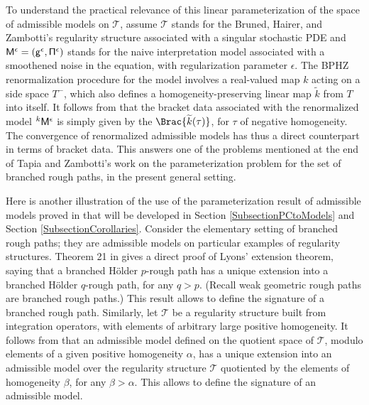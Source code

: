 To understand the practical relevance of this linear parameterization of the space of admissible models on $\mathscr{T}$, assume $\mathscr{T}$ stands for the Bruned, Hairer, and Zambotti's regularity structure \cite{BHZ} associated with a singular stochastic PDE and ${\sf M}^\epsilon = ({\sf g}^\epsilon,{\sf \Pi}^\epsilon)$ stands for the naive interpretation model associated with a smoothened noise in the equation, with regularization parameter $\epsilon$. The BPHZ renormalization procedure for the model involves a real-valued map $k$ acting on a side space $T^-$, which also defines a homogeneity-preserving linear map $\widetilde{k}$ from $T$ into itself. It follows from \cite[Th.\,21]{BH} that the bracket data associated with the renormalized model $^k{{\sf M}^\epsilon}$ is simply given by the $\Brac{\widetilde{k}(\tau)}$, for $\tau$ of negative homogeneity. The convergence of renormalized admissible models has thus a direct counterpart in terms of bracket data. This answers one of the problems mentioned at the end of Tapia and Zambotti's work \cite{TZ18} on the parameterization problem for the set of branched rough paths, in the present general setting.

Here is another illustration of the use of the parameterization result of admissible models proved in \cite{BH} that will be developed in Section \ref{SubsectionPCtoModels} and Section \ref{SubsectionCorollaries}. Consider the elementary setting of branched rough paths; they are admissible models on particular examples of regularity structures. Theorem 21 in \cite{BH} gives a direct proof of Lyons' extension theorem, saying that a branched Hölder $p$-rough path has a unique extension into a branched Hölder $q$-rough path, for any $q>p$. (Recall weak geometric rough paths are branched rough paths.) This result allows to define the signature of a branched rough path. Similarly, let $\mathscr{T}$ be a regularity structure built from integration operators, with elements of arbitrary large positive homogeneity. It follows from \hbox{\cite[Th.\,21]{BH}} that an admissible model defined on the quotient space of $\mathscr{T}$, modulo elements of a given positive homogeneity $\alpha$, has a unique extension into an admissible model over the regularity structure $\mathscr{T}$ quotiented by the elements of homogeneity $\beta$, for any $\beta>\alpha$. This allows to define the signature of an admissible model.

